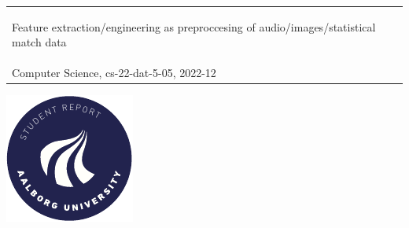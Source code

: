 \begin{titlepage}
{{\begin{tabular}{@{}p{\textwidth}@{}}
\begin{center}
{        Feature extraction/engineering as preproccesing of audio/images/statistical match data%
      }
    \end{center}
    \vspace{0.2cm}
   \begin{center}
    {\Large
      Daniel Runge Petersen, Gustav Svante Graversen, Lars Emanuel Hansen, Raymond Kacso, Sebastian Aaholm%
    }\\
    \vspace{0.2cm}
    {\large
      Computer Science, cs-22-dat-5-05, 2022-12%
    }
   \end{center}
   \vspace{0.2cm}
   \begin{center}
    {\Large
      Semester Project
    }
   \end{center}
  \end{tabular}}}
  \vfill
  \begin{center}
    \includegraphics[width=0.2\paperwidth]{figures/AAUgraphics/aau_logo_circle_en}%
  \end{center}
\end{titlepage}
\clearpage
